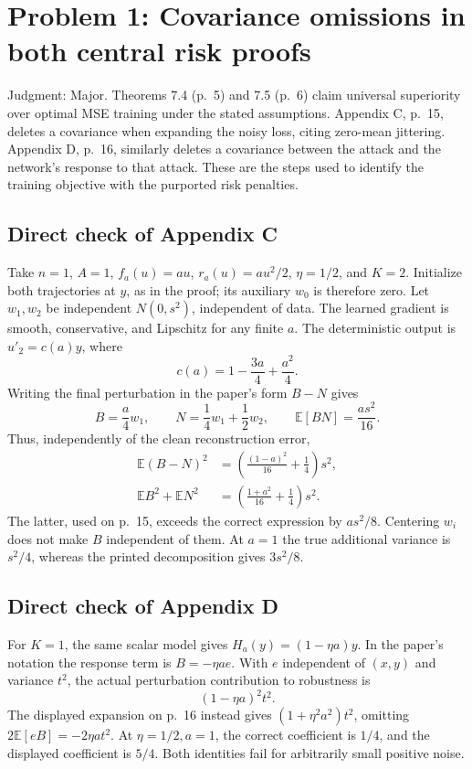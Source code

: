 \documentclass[10pt]{article}
\begin{document}
\section*{Problem 1: Covariance omissions in both central risk proofs}
Judgment: Major. Theorems 7.4 (p. 5) and 7.5 (p. 6) claim universal superiority over optimal MSE training under the stated assumptions. Appendix C, p. 15, deletes a covariance when expanding the noisy loss, citing zero-mean jittering. Appendix D, p. 16, similarly deletes a covariance between the attack and the network’s response to that attack. These are the steps used to identify the training objective with the purported risk penalties.\par
\subsection*{Direct check of Appendix C}
Take \(n=1\), \(A=1\), \(f_a(u)=au\), \(r_a(u)=au^2/2\), \(\eta=1/2\), and \(K=2\). Initialize both trajectories at \(y\), as in the proof; its auxiliary \(w_0\) is therefore zero. Let \(w_1,w_2\) be independent \(N(0,s^2)\), independent of data. The learned gradient is smooth, conservative, and Lipschitz for any finite \(a\). The deterministic output is \(u'_2=c(a)y\), where \[c(a)=1-\frac{3a}{4}+\frac{a^2}{4}.\] Writing the final perturbation in the paper’s form \(B-N\) gives \[B=\frac a4w_1,\qquad N=\frac14w_1+\frac12w_2,\qquad
 \mathbb E[BN]=\frac{a s^2}{16}.\] Thus, independently of the clean reconstruction error, \[\begin{aligned}
 \mathbb E(B-N)^2&=\left(\frac{(1-a)^2}{16}+\frac14\right)s^2,\\
 \mathbb E B^2+\mathbb E N^2&=\left(\frac{1+a^2}{16}+\frac14\right)s^2.\end{aligned}\] The latter, used on p. 15, exceeds the correct expression by \(as^2/8\). Centering \(w_i\) does not make \(B\) independent of them. At \(a=1\) the true additional variance is \(s^2/4\), whereas the printed decomposition gives \(3s^2/8\).\par
\subsection*{Direct check of Appendix D}
For \(K=1\), the same scalar model gives \(H_a(y)=(1-\eta a)y\). In the paper’s notation the response term is \(B=-\eta a e\). With \(e\) independent of \((x,y)\) and variance \(t^2\), the actual perturbation contribution to robustness is \[(1-\eta a)^2 t^2.\] The displayed expansion on p. 16 instead gives \((1+\eta^2a^2)t^2\), omitting \(2\mathbb E[eB]=-2\eta a t^2\). At \(\eta=1/2,a=1\), the correct coefficient is \(1/4\), and the displayed coefficient is \(5/4\). Both identities fail for arbitrarily small positive noise.\par
\end{document}
